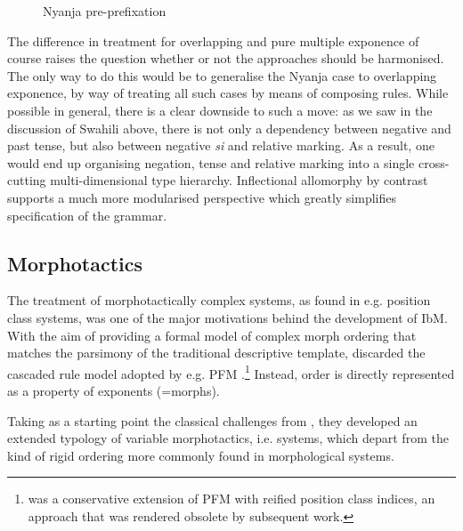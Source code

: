 \begin{figure}
\begin{center}
{{      
    
       
    
    }}

  \end{center}
  
  \caption{Nyanja pre-prefixation \citep{Crysmann:14:OUP}}
  \label{fig:Nyanja}
\end{figure}

The difference in treatment for overlapping and pure multiple
exponence of course raises the question whether or not the approaches
should be harmonised. The only way to do this would be to generalise
the Nyanja case to overlapping exponence, by way of treating all such
cases by means of composing rules. While possible in general, there is
a clear downside to such a move: as we saw in the discussion of
Swahili above, there is not only a dependency between negative and
past tense, but also between negative \textit{si} and relative
marking. As a result, one would end up organising negation, tense and
relative marking into a single cross-cutting multi-dimensional type
hierarchy. Inflectional allomorphy by contrast supports a much more
modularised perspective which greatly simplifies specification of the
grammar.  

\subsection{Morphotactics}
\label{sec:Mortax}

The treatment of morphotactically complex systems, as found in e.g.
position class systems, was one of the major motivations behind the
development of IbM. With the aim of providing a formal model of
complex morph ordering that matches the parsimony of the traditional
descriptive template, \citet{Crysmann:Bonami:2016} discarded the
cascaded rule model adopted by e.g. PFM
\citep{Stump01}.\footnote{\citet{Crysmann12} was a conservative
  extension of PFM with reified position class indices, an approach
  that was rendered obsolete by subsequent work.} Instead, order is
directly represented as a property of exponents (=morphs).

Taking as a starting point  the classical challenges from \citet{Stump93},
they developed an extended typology of variable morphotactics,
i.e. systems, which depart from the kind of rigid ordering more
commonly found in morphological systems.

